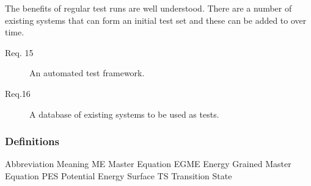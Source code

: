 The benefits of regular test runs are well understood. There are a number of existing systems that can form an initial test set and these can be added to over time.


\begin{description}
\item[Req. 15]{An automated test framework.}
\item[Req.16]{A database of existing systems to be used as tests.}
\end{description}

\subsubsection{Definitions}\label{sec:Definitions}

Abbreviation  Meaning
ME  Master Equation
EGME  Energy Grained Master Equation
PES Potential Energy Surface
TS  Transition State
  
  

